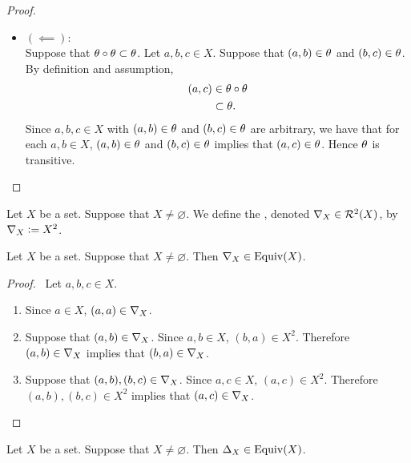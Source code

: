 \begin{proof}
\begin{enumerate}
\begin{itemize}
			\item $(\impliedby)$: \\
			Suppose that $\theta \circ \theta \subset \theta$. Let $a,b,c \in X$. Suppose that $(a,b) \in \theta$ and $(b,c) \in \theta$. By definition and assumption, 
			\begin{align*}
				(a,c) 
				& \in \theta \circ \theta \\
				& \subset \theta. 
			\end{align*}
			Since $a,b,c \in X$ with $(a,b) \in \theta$ and $(b,c) \in \theta$ are arbitrary, we have that for each $a,b \in X$, $(a,b) \in \theta$ and $(b,c) \in \theta$ implies that $(a,c) \in \theta$. Hence $\theta$ is transitive. 
		\end{itemize}
	\end{enumerate}
\end{proof}

\begin{defn}
	Let $X$ be a set. Suppose that $X \neq \varnothing$. We define the , denoted $\operatorname{\nabla}_X \in \mathcal{R}^2(X)$, by $\operatorname{\nabla}_X \vcentcolon= X^2$. 
\end{defn}

\begin{ex}
	Let $X$ be a set. Suppose that $X \neq \varnothing$. Then $\operatorname{\nabla}_X \in \operatorname*{\text{Equiv}}(X)$.
\end{ex}

\begin{proof}\
	Let $a,b, c \in X$. 
	\begin{enumerate}
		\item Since $a \in X$, $(a,a) \in \operatorname{\nabla}_X$.
		\item Suppose that $(a,b) \in \operatorname{\nabla}_X$. Since $a,b \in X$, $(b,a) \in X^2$. 
		Therefore $(a,b) \in \operatorname{\nabla}_X$ implies that $(b,a) \in \operatorname{\nabla}_X$.
		\item Suppose that $(a,b), (b, c) \in \operatorname{\nabla}_X$. Since $a,c \in X$, $(a,c) \in X^2$. Therefore $(a,b), (b,c) \in X^2$ implies that $(a,c) \in \operatorname{\nabla}_X$.
	\end{enumerate}
\end{proof}

\begin{ex}
	Let $X$ be a set. Suppose that $X \neq \varnothing$. Then $\Delta_X \in \operatorname*{\text{Equiv}}(X)$. 
\end{ex}

